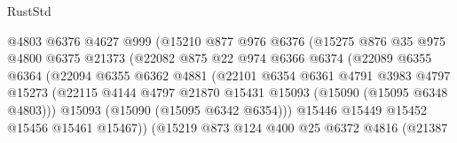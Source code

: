 \begin{lexlean}{RustStd}
\begin{coremodule}
                              @4803
                              @6376
                              @4627
                              @999
                              (@15210
                                @877
                                @976
                                @6376
                                (@15275
                                  @876
                                  @35
                                  @975
                                  @4800
                                  @6375
                                  @21373
                                  (@22082
                                    @875
                                    @22
                                    @974
                                    @6366
                                    @6374
                                    (@22089
                                      @6355
                                      @6364
                                      (@22094
                                        @6355
                                        @6362
                                        @4881
                                        (@22101
                                          @6354
                                          @6361
                                          @4791
                                          @3983
                                          @4797
                                          @15273
                                          (@22115
                                            @4144
                                            @4797
                                            @21870
                                            @15431
                                            @15093
                                            (@15090 (@15095 @6348 @4803)))
                                          @15093
                                          (@15090 (@15095 @6342 @6354)))
                                        @15446
                                        @15449
                                        @15452
                                        @15456
                                        @15461
                                        @15467))
                                    (@15219
                                      @873
                                      @124
                                      @400
                                      @25
                                      @6372
                                      @4816
                                      (@21387

\end{coremodule}
\end{lexlean}
